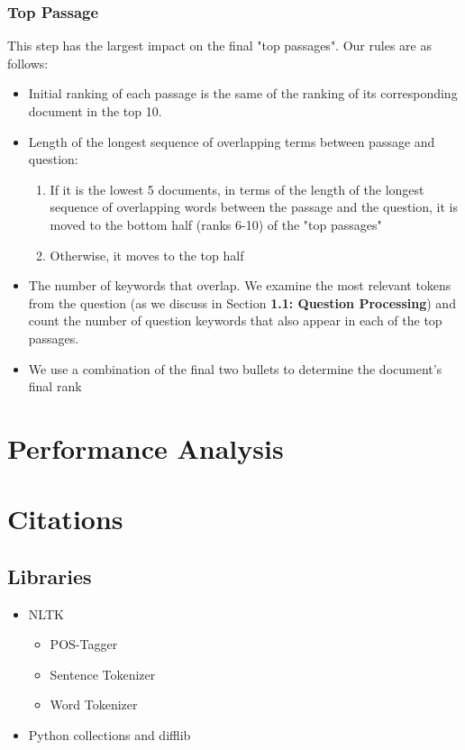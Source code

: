 \documentclass{article}
\begin{document}
\subsubsection{Top Passage}
This step has the largest impact on the final "top passages". Our rules are as follows:
\begin{itemize}
\item Initial ranking of each passage is the same of the ranking of its corresponding document in the top 10.
\item Length of the longest sequence of overlapping terms between passage and question:
	\begin{enumerate}
	\item If it is the lowest 5 documents, in terms of the length of the longest sequence of overlapping words between the passage and the question, it is moved to the bottom half (ranks 6-10) of the "top passages"
	\item Otherwise, it moves to the top half
	\end{enumerate}
\item The number of keywords that overlap. We examine the most relevant tokens from the question (as we discuss in Section \textbf{1.1: Question Processing}) and count the number of question keywords that also appear in each of the top passages.
\item We use a combination of the final two bullets to determine the document's final rank
\end{itemize}
\section{Performance Analysis}

\section{Citations}
\subsection{Libraries}
\begin{itemize}
\item NLTK
	\begin{itemize}
	\item POS-Tagger
	\item Sentence Tokenizer
	\item Word Tokenizer
	\end{itemize}
\item Python collections and difflib
\end{itemize}
\end{document}

